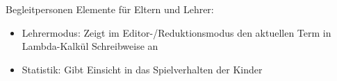 \documentclass[18pt]{beamer}
\begin{document}
\begin{frame}{Begleitpersonen}
	Elemente für Eltern und Lehrer:
	\begin{itemize}[<+->]
	\item Lehrermodus: Zeigt im Editor-/Reduktionsmodus den aktuellen Term in Lambda-Kalkül Schreibweise an
	\item Statistik: Gibt Einsicht in das Spielverhalten der Kinder
	\end{itemize}
\end{frame}
\end{document}
